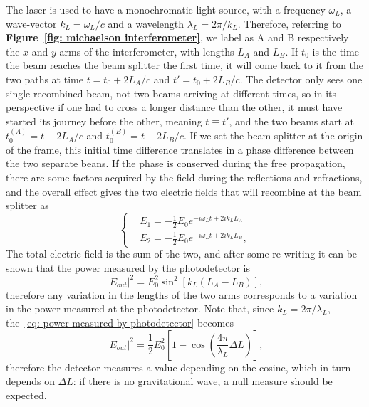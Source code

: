 The laser is used to have a monochromatic light source, with a frequency $\omega_L$, a wave-vector $k_L=\omega_L/c$ and a wavelength $\lambda_L = 2\pi/k_L$.
Therefore, referring to \textbf{Figure~\ref{fig: michaelson interferometer}}, we label as A and B respectively the $x$ and $y$ arms of the interferometer, with lengths $L_A$ and $L_B$.
If $t_0$ is the time the beam reaches the beam splitter the first time, it will come back to it from the two paths at time $t = t_0 + 2L_{A}/c$ and $t'= t_0 + 2L_B/c$.
The detector only sees one single recombined beam, not two beams arriving at different times, so in its perspective if one had to cross a longer distance than the other, it must have started its journey before the other, meaning $t\equiv t'$, and the two beams start at $t_0^{(A)} = t - 2L_A/c$ and $t_0^{(B)} = t - 2L_B/c$.
If we set the beam splitter at the origin of the frame, this initial time difference translates in a phase difference between the two separate beans. 
If the phase is conserved during the free propagation, there are some factors acquired by the field during the reflections and refractions, and the overall effect gives the two electric fields that will recombine at the beam splitter as
\begin{equation}
    \left\{
        \begin{aligned}
            &E_1 = -\frac{1}{2}E_0e^{-i\omega_Lt + 2ik_LL_A} \\
            &E_2 = -\frac{1}{2}E_0e^{-i\omega_Lt + 2ik_LL_B},
        \end{aligned}
    \right.
    \label{eq: fields in arms of michaelson}
\end{equation}
The total electric field is the sum of the two, and after some re-writing it can be shown that the power measured by the photodetector is 
\begin{equation}
    |E_{out}|^2 = E_0^2 \sin^2[k_L(L_A-L_B)],
    \label{eq: power measured by photodetector}
\end{equation}
therefore any variation in the lengths of the two arms corresponds to a variation in the power measured at the photodetector.
Note that, since $k_L=2\pi/\lambda_L$, the~\eqref{eq: power measured by photodetector} becomes
\begin{equation*}
    |E_{out}|^2 = \frac{1}{2} E_0^2 \left[1-\cos{\left(\frac{4\pi}{\lambda_L}\Delta L\right)}\right],
\end{equation*}
therefore the detector measures a value depending on the cosine, which in turn depends on $\Delta L$: if there is no gravitational wave, a null measure should be expected.

